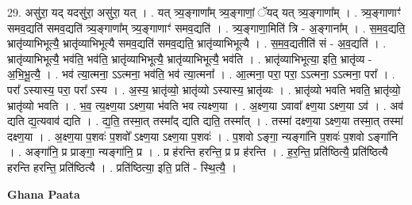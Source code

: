 \documentclass[17pt]{extarticle}
\begin{document}
29. असु॑रा॒ यद् यदसु॑रा॒ असु॑रा॒ यत् । . यत् त्र्य॒ङ्गाणा᳚म् त्र्य॒ङ्गाणां॒ ॅयद् यत् त्र्य॒ङ्गाणा᳚म् । . त्र्य॒ङ्गाणाꣳ॑ समव॒द्यति॑ समव॒द्यति॑ त्र्य॒ङ्गाणा᳚म् त्र्य॒ङ्गाणाꣳ॑ समव॒द्यति॑ । . त्र्य॒ङ्गाणा॒मिति॑ त्रि - अ॒ङ्गाना᳚म् । . स॒म॒व॒द्यति॒ भ्रातृ॑व्याभिभूत्यै॒ भ्रातृ॑व्याभिभूत्यै समव॒द्यति॑ समव॒द्यति॒ भ्रातृ॑व्याभिभूत्यै । . स॒म॒व॒द्यतीति॑ सं - अ॒व॒द्यति॑ । . भ्रातृ॑व्याभिभूत्यै॒ भव॑ति॒ भव॑ति॒ भ्रातृ॑व्याभिभूत्यै॒ भ्रातृ॑व्याभिभूत्यै॒ भव॑ति । . भ्रातृ॑व्याभिभूत्या॒ इति॒ भ्रातृ॑व्य - अ॒भि॒भू॒त्यै॒ । . भव॑ त्या॒त्मना॒ ऽऽत्मना॒ भव॑ति॒ भव॑ त्या॒त्मना᳚ । . आ॒त्मना॒ परा॒ परा॒ ऽऽत्मना॒ ऽऽत्मना॒ परा᳚ । . परा᳚ ऽस्यास्य॒ परा॒ परा᳚ ऽस्य । . अ॒स्य॒ भ्रातृ॑व्यो॒ भ्रातृ॑व्यो ऽस्यास्य॒ भ्रातृ॑व्यः । . भ्रातृ॑व्यो भवति भवति॒ भ्रातृ॑व्यो॒ भ्रातृ॑व्यो भवति । . भ॒व॒ त्य॒क्ष्ण॒या ऽक्ष्ण॒या भ॑वति भव त्यक्ष्ण॒या । . अ॒क्ष्ण॒या ऽवावा᳚ क्ष्ण॒या ऽक्ष्ण॒या ऽव॑ । . अव॑ द्यति द्य॒त्यवाव॑ द्यति । . द्य॒ति॒ तस्मा॒त् तस्मा᳚द् द्यति द्यति॒ तस्मा᳚त् । . तस्मा॑ दक्ष्ण॒या ऽक्ष्ण॒या तस्मा॒त् तस्मा॑ दक्ष्ण॒या । . अ॒क्ष्ण॒या प॒शवः॑ प॒शवो᳚ ऽक्ष्ण॒या ऽक्ष्ण॒या प॒शवः॑ । . प॒शवो ऽङ्गा॒ न्यङ्गा॑नि प॒शवः॑ प॒शवो ऽङ्गा॑नि । . अङ्गा॑नि॒ प्र प्राङ्गा॒ न्यङ्गा॑नि॒ प्र । . प्र ह॑रन्ति हरन्ति॒ प्र प्र ह॑रन्ति । . ह॒र॒न्ति॒ प्रति॑ष्ठित्यै॒ प्रति॑ष्ठित्यै हरन्ति हरन्ति॒ प्रति॑ष्ठित्यै । . प्रति॑ष्ठित्या॒ इति॒ प्रति॑ - स्थि॒त्यै॒ । \newline

\textbf{Ghana Paata } \newline
\end{document}

